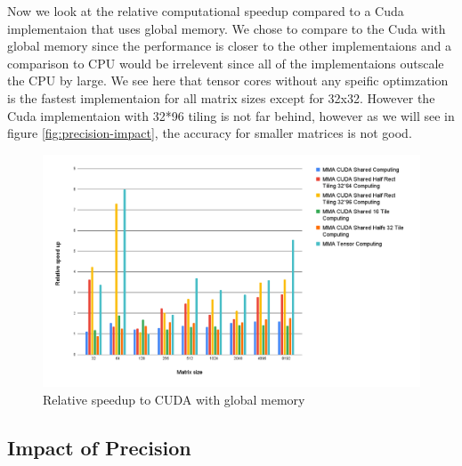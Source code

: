 \documentclass[conference]{IEEEtran}
\begin{document}
  Now we look at the relative computational speedup compared to a Cuda implementaion that uses global memory.
  We chose to compare to the Cuda with global memory since the performance is closer to 
  the other implementaions and a comparison to CPU would be irrelevent since all of the implementaions
  outscale the CPU by large. We see here that tensor cores without any speific optimzation is the fastest
  implementaion for all matrix sizes except for 32x32. However the Cuda implementaion with 32*96 tiling is not far behind,
  however as we will see in figure \ref{fig:precision-impact}, the accuracy for smaller matrices is not good.

  \begin{figure}[h]
    \centering
    \includegraphics[scale=0.2]{figures/relative_speedup.png}
    \caption{Relative speedup to CUDA with global memory}
    \label{fig:performance-comparison}
  \end{figure}
  
  
  
  \subsection{Impact of Precision}\label{sec:impact-precision}
  
\end{document}
